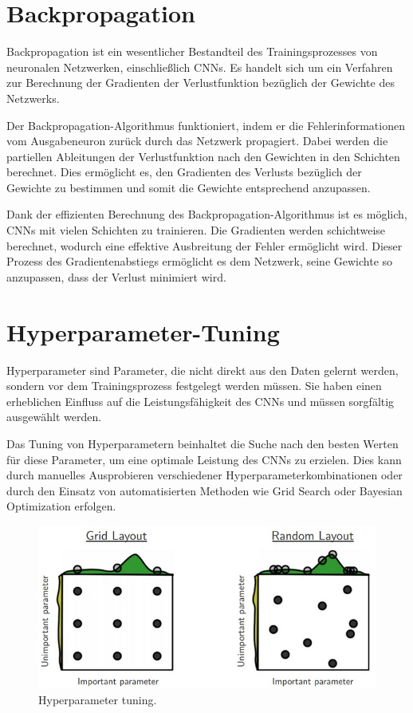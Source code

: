 \section{Backpropagation}
    Backpropagation ist ein wesentlicher Bestandteil des Trainingsprozesses von neuronalen Netzwerken, einschließlich CNNs. Es handelt sich um ein Verfahren zur Berechnung der Gradienten der Verlustfunktion bezüglich der Gewichte des Netzwerks.
    
    Der Backpropagation-Algorithmus funktioniert, indem er die Fehlerinformationen vom Ausgabeneuron zurück durch das Netzwerk propagiert. Dabei werden die partiellen Ableitungen der Verlustfunktion nach den Gewichten in den Schichten berechnet. Dies ermöglicht es, den Gradienten des Verlusts bezüglich der Gewichte zu bestimmen und somit die Gewichte entsprechend anzupassen.
    
    Dank der effizienten Berechnung des Backpropagation-Algorithmus ist es möglich, CNNs mit vielen Schichten zu trainieren. Die Gradienten werden schichtweise berechnet, wodurch eine effektive Ausbreitung der Fehler ermöglicht wird. Dieser Prozess des Gradientenabstiegs ermöglicht es dem Netzwerk, seine Gewichte so anzupassen, dass der Verlust minimiert wird.

\section{Hyperparameter-Tuning}
    Hyperparameter sind Parameter, die nicht direkt aus den Daten gelernt werden, sondern vor dem Trainingsprozess festgelegt werden müssen. Sie haben einen erheblichen Einfluss auf die Leistungsfähigkeit des CNNs und müssen sorgfältig ausgewählt werden.
    
    Das Tuning von Hyperparametern beinhaltet die Suche nach den besten Werten für diese Parameter, um eine optimale Leistung des CNNs zu erzielen. Dies kann durch manuelles Ausprobieren verschiedener Hyperparameterkombinationen oder durch den Einsatz von automatisierten Methoden wie Grid Search oder Bayesian Optimization erfolgen.
    
    \begin{figure}[h]
        \centering
        \includegraphics[width=\textwidth]{img/hyperparameter_tuning.png}
        \caption{Hyperparameter tuning.}
        \label{fig:hyperparameter_tuning}
    \end{figure}
    
